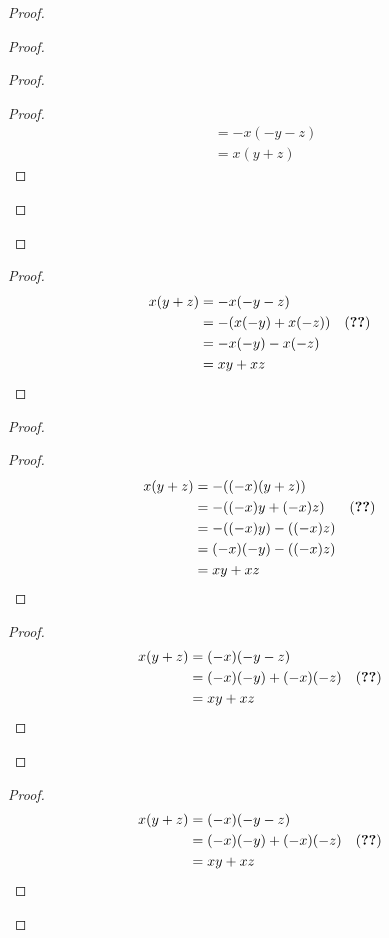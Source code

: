 \documentclass{book}
\let\qed\relax
\theoremstyle{definition}
\begin{document}
\begin{proof}
\begin{proof}
\begin{proof}
\begin{proof}
\begin{align*}
				& = -x(-y-z) \\
				& = x(y+z)
			\end{align*}
		\end{proof}
	\end{proof}
\end{proof}
\begin{proof}
	\pf
	\begin{align*}
		x(y+z) & = -x(-y-z) \\
		& = -(x(-y) + x(-z)) & (\text{\stepref{1}}) \\
		& = -x(-y) -x(-z) \\
		& = xy + xz
	\end{align*}
\end{proof}
\begin{proof}
	\begin{proof}
		\pf
		\begin{align*}
			x(y+z) & = -((-x)(y+z)) \\
			& = -((-x)y + (-x)z) & (\text{\stepref{3}}) \\
			& = -((-x)y) -((-x)z) \\
			& = (-x)(-y) - ((-x)z) \\
			& = xy+xz
		\end{align*}
	\end{proof}
	\begin{proof}
		\pf
		\begin{align*}
			x(y+z) & = (-x)(-y-z) \\
			& = (-x)(-y) + (-x)(-z) & (\text{\stepref{3}}) \\
			& = xy + xz
		\end{align*}
	\end{proof}
\end{proof}
\begin{proof}
	\pf
	\begin{align*}
		x(y+z) & = (-x)(-y-z) \\
		& = (-x)(-y) + (-x)(-z) & (\text{\stepref{1}}) \\
		& = xy + xz
	\end{align*}
\end{proof}
\qed
\end{proof}
\end{document}
